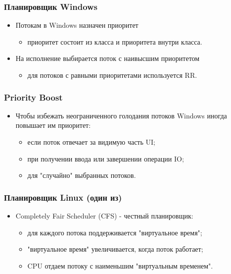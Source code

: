 \begin{frame}
\frametitle{Планировщик Windows}
\begin{itemize}
    \item<1->Потокам в Windows назначен приоритет
    \begin{itemize}
        \item<1->приоритет состоит из класса и приоритета внутри класса.
    \end{itemize}
    \item<2->На исполнение выбирается поток с наивысшим приоритетом
    \begin{itemize}
        \item<3->для потоков с равными приоритетами используется RR.
    \end{itemize}
\end{itemize}
\end{frame}

\begin{frame}
\frametitle{Priority Boost}
\begin{itemize}
    \item<1->Чтобы избежать неограниченного голодания потоков Windows иногда
         повышает им приоритет:
    \begin{itemize}
        \item<2->если поток отвечает за видимую часть UI;
        \item<3->при получении ввода или завершении операции IO;
        \item<4->для "случайно" выбранных потоков.
    \end{itemize}
\end{itemize}
\end{frame}


\begin{frame}
\frametitle{Планировщик Linux (один из)}
\begin{itemize}
    \item<1->Completely Fair Scheduler (CFS) - честный планировщик:
    \begin{itemize}
        \item<2->для каждого потока поддерживается "виртуальное время";
        \item<3->"виртуальное время" увеличивается, когда поток работает;
        \item<4->CPU отдаем потоку с наименьшим "виртуальным временем".
    \end{itemize}
\end{itemize}
\end{frame}
